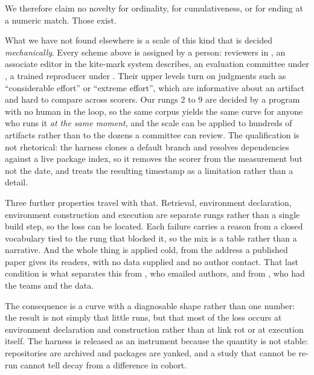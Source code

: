 We therefore claim no novelty for ordinality, for cumulativeness, or for ending
at a numeric match. Those exist.

What we have not found elsewhere is a scale of this kind that is decided
\emph{mechanically}. Every scheme above is assigned by a person: reviewers in
\citet{Vandewalle2009}, an associate editor in the kite-mark system
\citet{Peng2011} describes, an evaluation committee under
\citep{ACMBadging2020}, a trained reproducer under \citep{ACREGuide}. Their
upper levels turn on judgments such as ``considerable effort'' or ``extreme
effort'', which are informative about an artifact and hard to compare across
scorers. Our rungs 2 to 9 are decided by a program with no human in the loop, so
the same corpus yields the same curve for anyone who runs it \emph{at the same
moment}, and the scale can be applied to hundreds of artifacts rather than to the
dozens a committee can review. The qualification is not rhetorical: the harness
clones a default branch and resolves dependencies against a live package index,
so it removes the scorer from the measurement but not the date, and
 treats the resulting timestamp as a limitation rather than
a detail.

Three further properties travel with that. Retrieval, environment declaration,
environment construction and execution are separate rungs rather than a single
build step, so the loss can be located. Each failure carries a reason from a
closed vocabulary tied to the rung that blocked it, so the mix is a table rather
than a narrative. And the whole thing is applied cold, from the address a
published paper gives its readers, with no data supplied and no author contact. That last condition is what separates this from \citet{Collberg2015},
who emailed authors, and from \citet{Perignon2024}, who had the teams and the
data.

The consequence is a curve with a diagnosable shape rather than one number: the
result is not simply that little runs, but that most of the loss occurs at
environment declaration and construction rather than at link rot or at execution
itself. The harness is released as an instrument because the quantity is not
stable: repositories are archived and packages are yanked, and a study that
cannot be re-run cannot tell decay from a difference in cohort.
